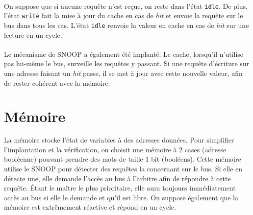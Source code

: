 \documentclass[a4paper, 11pt]{article}
\begin{document}
\paragraph{}On suppose que si aucune requête n'est reçue, on reste dans l'état
\texttt{idle}. De plus, l'état \texttt{write} fait la mise à jour du cache en
cas de \textit{hit} et envoie la requête sur le bus dans tous les cas. L'état 
\texttt{idle} renvoie la valeur en cache en cas de \textit{hit} sur une lecture
en un cycle.
\paragraph{}Le mécanisme de SNOOP a également été implanté. Le cache, lorsqu'il
n'utilise pas lui-même le bus, surveille les requêtes y passant. Si une requête
d'écriture sur une adresse faisant un \textit{hit} passe, il se met à jour avec
cette nouvelle valeur, afin de rester cohérent avec la mémoire.

\section{Mémoire}
La mémoire stocke l'état de variables à des adresses données. Pour simplifier
l'implantation et la vérification, on choisit une mémoire à 2 cases (adresse 
booléenne) pouvant prendre des mots de taille 1 bit (booléens). Cette mémoire
utilise le SNOOP pour détecter des requêtes la concernant sur le bus. Si elle
en détecte une, elle demande l'accès au bus à l'arbitre afin de répondre à
cette requête. \'Etant le maître le plus prioritaire, elle aura toujours
immédiatement accès au bus si elle le demande et qu'il est libre. On 
suppose également que la mémoire est extrêmement réactive et répond en un
cycle.
\end{document}
